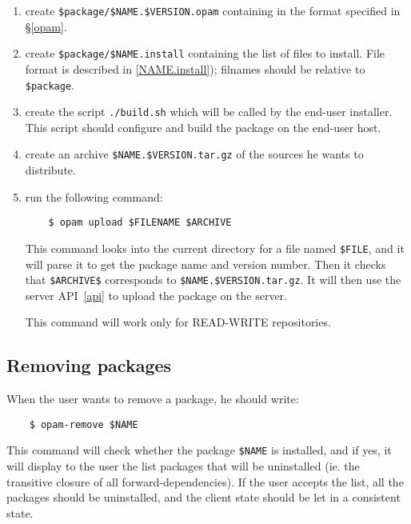 \documentclass[a4paper,11pt]{article}
\begin{document}
\begin{enumerate}

\item create \verb+$package/$NAME.$VERSION.opam+ containing in the format
  specified in \S\ref{opam}.

\item create \verb+$package/$NAME.install+ containing the list of files
  to install. File format is described in \ref{NAME.install});
  filnames should be relative to \verb+$package+.

\item create the script {\tt ./build.sh} which will be called by the
  end-user installer. This script should configure and build the
  package on the end-user host.

\item create an archive \verb+$NAME.$VERSION.tar.gz+ of the sources he
  wants to distribute.

\item run the following command:

\begin{verbatim}
    $ opam upload $FILENAME $ARCHIVE
\end{verbatim}

This command looks into the current directory for a file named 
\verb+$FILE+, and it will parse it to get the package name and version
number. Then it checks that \verb+$ARCHIVE$+ corresponds to
\verb+$NAME.$VERSION.tar.gz+. It will then use the server API~\ref{api} to
upload the package on the server.

This command will work only for READ-WRITE repositories.

\end{enumerate}

\subsection{Removing packages}

When the user wants to remove a package, he should write:

\begin{verbatim}
    $ opam-remove $NAME
\end{verbatim}

This command will check whether the package \verb+$NAME+ is installed,
and if yes, it will display to the user the list packages that will be
uninstalled (ie. the transitive closure of all forward-dependencies).
If the user accepts the list, all the packages should be uninstalled,
and the client state should be let in a consistent state.
\end{document}
